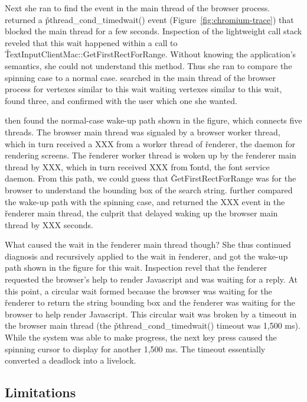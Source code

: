 Next she ran \xxx to find the event in the main thread of the browser
process.  \xxx returned a \v{pthread\_cond\_timedwait()} event
(Figure~\ref{fig:chromium-trace}) that blocked the main thread for a few
seconds.  Inspection of the lightweight call stack reveled that this wait
happened within a call to \v{TextInputClientMac::GetFirstRectForRange}.
Without knowing the application's semantics, she could not understand this
method.  Thus she ran \xxx to compare the spinning case to a normal case.
\xxx searched in the main thread of the browser process for vertexes
similar to this wait waiting vertexes similar to this wait, found three,
and confirmed with the user which one she wanted.

\xxx then found the normal-case wake-up path shown in the figure, which
connects five threads.  The browser main thread was signaled by a browser
worker thread, which in turn received a XXX from a worker thread of
\v{renderer}, the daemon for rendering screens.  The \v{renderer} worker
thread is woken up by the \v{renderer} main thread by XXX, which in turn
received XXX from \v{fontd}, the font service daemon.  From this path, we
could guess that \v{GetFirstRectForRange} was for the browser to
understand the bounding box of the search string.  \xxx further compared
the wake-up path with the spinning case, and returned the XXX event in the
\v{renderer} main thread, the culprit that delayed waking up the browser
main thread by XXX seconds.

What caused the wait in the \v{renderer} main thread though?  She thus
continued diagnosis and recursively applied \xxx to the wait in
\v{renderer}, and got the wake-up path shown in the figure for this wait.
Inspection revel that the \v{renderer} requested the browser's help to
render Javascript and was waiting for a reply.  At this point, a circular
wait formed because the browser was waiting for the \v{renderer} to return
the string bounding box and the \v{renderer} was waiting for the browser
to help render Javascript.  This circular wait was broken by a timeout in
the browser main thread (the \v{pthread\_cond\_timedwait()} timeout was
1,500 ms).  While the system was able to make progress, the next key press
caused the spinning cursor to display for another 1,500 ms.  The timeout
essentially converted a deadlock into a livelock.

\subsection{Limitations}

